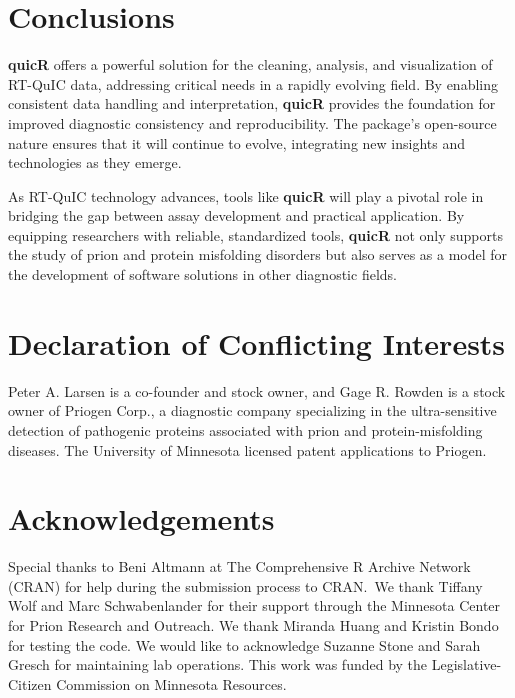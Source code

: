 \documentclass[preprint,12pt,a4paper]{elsarticle}
\begin{document}
    \section{Conclusions} 
        \textbf{quicR} offers a powerful solution for the cleaning, analysis, and visualization of RT-QuIC data, addressing critical needs in a rapidly evolving field. By enabling consistent data handling and interpretation, \textbf{quicR} provides the foundation for improved diagnostic consistency and reproducibility. The package's open-source nature ensures that it will continue to evolve, integrating new insights and technologies as they emerge.

        As RT-QuIC technology advances, tools like \textbf{quicR} will play a pivotal role in bridging the gap between assay development and practical application. By equipping researchers with reliable, standardized tools, \textbf{quicR} not only supports the study of prion and protein misfolding disorders but also serves as a model for the development of software solutions in other diagnostic fields.

    \section*{Declaration of Conflicting Interests}
        Peter A. Larsen is a co-founder and stock owner, and Gage R. Rowden is a stock owner of Priogen Corp., a diagnostic company specializing in the ultra-sensitive detection of pathogenic proteins associated with prion and protein-misfolding diseases. The University of Minnesota licensed patent applications to Priogen.

    \section*{Acknowledgements}
        Special thanks to Beni Altmann at The Comprehensive R Archive Network (CRAN) for help during the submission process to CRAN.\ We thank Tiffany Wolf and Marc Schwabenlander for their support through the Minnesota Center for Prion Research and Outreach. We thank Miranda Huang and Kristin Bondo for testing the code. We would like to acknowledge Suzanne Stone and Sarah Gresch for maintaining lab operations. This work was funded by the Legislative-Citizen Commission on Minnesota Resources.


     
    
\end{document}
